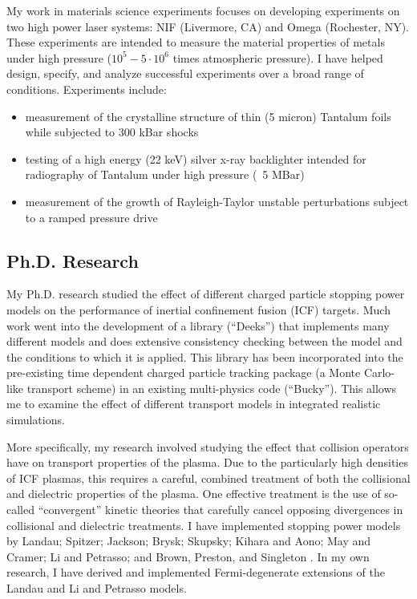 \documentclass[letterpaper,10pt]{article}
\begin{document}
My work in materials science experiments focuses on developing
experiments on two high power laser systems: NIF (Livermore, CA) and Omega
(Rochester, NY).  These experiments are intended to measure the material
properties of metals under high pressure ($10^5 - 5 \cdot 10^6$ times atmospheric
pressure).  I have helped design, specify, and analyze successful
experiments over a broad range of conditions.  Experiments include:
\begin{itemize}
	\item measurement of the crystalline structure of thin (5 micron)
		Tantalum foils while subjected to 300 kBar shocks
	\item testing of a high energy (22 keV) silver x-ray backlighter intended for
		radiography of Tantalum under high pressure (~5 MBar)
	\item measurement of the growth of Rayleigh-Taylor unstable
		perturbations subject to a ramped pressure drive
\end{itemize}


\subsection*{Ph.D. Research}
My Ph.D. research studied the effect of different charged particle stopping
power models on the performance of inertial confinement fusion (ICF) targets.
Much work went into the development of a library (``Deeks'') that implements
many different models and does extensive consistency checking between the model
and the conditions to which it is applied.  This library has been incorporated
into the pre-existing time dependent charged particle tracking package (a Monte
Carlo-like transport scheme) in an existing multi-physics code (``Bucky'').
This allows me to examine the effect of different transport models
in integrated realistic simulations.

\vspace{0.1in}

More specifically, my research involved studying the effect that collision operators have on transport properties of the plasma.  Due to the particularly high densities of ICF plasmas, this requires a careful, combined treatment of both the collisional and dielectric properties of the plasma.  One effective treatment is the use of so-called ``convergent'' kinetic theories that carefully cancel opposing divergences in collisional and dielectric treatments.  I have implemented stopping power models by 
Landau; 
Spitzer; 
Jackson; 
Brysk; 
Skupsky; 
Kihara and Aono; 
May and Cramer; 
Li and Petrasso; 
and 
Brown, Preston, and Singleton%
.
In my own research, I have derived and implemented Fermi-degenerate extensions of the Landau and Li and Petrasso models.  
\end{document}
